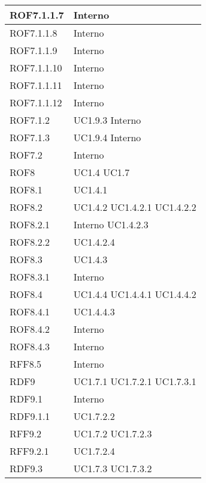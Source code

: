 \begin{center}
\begin{longtable}{| p{4cm} | p{4cm} |}
ROF7.1.1.7   &  Interno \\
\hline
ROF7.1.1.8   &  Interno \\
\hline
ROF7.1.1.9   &  Interno \\
\hline
ROF7.1.1.10   &  Interno \\
\hline
ROF7.1.1.11   &  Interno \\
\hline
ROF7.1.1.12   &  Interno \\
\hline
ROF7.1.2   &  UC1.9.3 \newline Interno \\
\hline
ROF7.1.3   &  UC1.9.4 \newline Interno \\
\hline
ROF7.2   &  Interno \\
\hline
ROF8   &  UC1.4 \newline UC1.7 \\
\hline
ROF8.1   &  UC1.4.1 \\
\hline
ROF8.2   &  UC1.4.2 \newline UC1.4.2.1 \newline UC1.4.2.2  \\
\hline
ROF8.2.1   &  Interno \newline UC1.4.2.3 \\
\hline
ROF8.2.2   &  UC1.4.2.4 \\
\hline
ROF8.3   &  UC1.4.3 \\
\hline
ROF8.3.1   &  Interno \\
\hline
ROF8.4   &  UC1.4.4 \newline UC1.4.4.1 \newline UC1.4.4.2 \\
\hline
ROF8.4.1   &  UC1.4.4.3 \\
\hline
ROF8.4.2   &  Interno \\
\hline
ROF8.4.3   &  Interno \\
\hline
RFF8.5   &  Interno \\
\hline
RDF9   &  UC1.7.1 \newline UC1.7.2.1 \newline UC1.7.3.1 \\
\hline
RDF9.1   &  Interno \\
\hline
RDF9.1.1   &  UC1.7.2.2 \\
\hline
RFF9.2   &  UC1.7.2 \newline UC1.7.2.3 \\
\hline
RFF9.2.1   &  UC1.7.2.4 \\
\hline
RDF9.3   &  UC1.7.3 \newline UC1.7.3.2 \\

\end{longtable}
\end{center}
